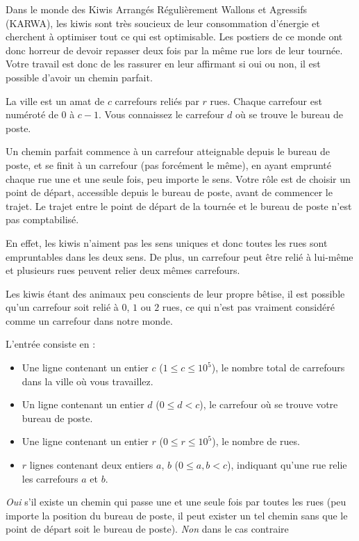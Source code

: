 

Dans le monde des Kiwis Arrangés Régulièrement Wallons et Agressifs (KARWA), les kiwis sont très soucieux de leur consommation d'énergie et cherchent à optimiser tout ce qui est optimisable. Les postiers de ce monde ont donc horreur de devoir repasser deux fois par la même rue lors de leur tournée. Votre travail est donc de les rassurer en leur affirmant si oui ou non, il est possible d'avoir un chemin parfait.

La ville est un amat de $c$ carrefours reliés par $r$ rues. Chaque carrefour est numéroté de $0$ à $c-1$. Vous connaissez le carrefour $d$ où se trouve le bureau de poste.

Un chemin parfait commence à un carrefour atteignable depuis le bureau de poste, et se finit à un carrefour (pas forcément le même), en ayant emprunté chaque rue une et une seule fois, peu importe le sens. Votre rôle est de choisir un point de départ, accessible depuis le bureau de poste, avant de commencer le trajet. Le trajet entre le point de départ de la tournée et le bureau de poste n'est pas comptabilisé.

En effet, les kiwis n'aiment pas les sens uniques et donc toutes les rues sont empruntables dans les deux sens. De plus, un carrefour peut être relié à lui-même et plusieurs rues peuvent relier deux mêmes carrefours.

Les kiwis étant des animaux peu conscients de leur propre bêtise, il est possible qu'un carrefour soit relié à $0$, $1$ ou $2$ rues, ce qui n'est pas vraiment considéré comme un carrefour dans notre monde.

\begin{Input}
    L'entrée consiste en :
    \begin{itemize}
        \item Une ligne contenant un entier $c$ ($1 \leq c \leq 10^5$), le nombre total de carrefours dans la ville où vous travaillez.
        \item Un ligne contenant un entier $d$ ($0 \leq d < c$), le carrefour où se trouve votre bureau de poste.
        \item Une ligne contenant un entier $r$ ($0 \leq r \leq 10^5$), le nombre de rues.
        \item $r$ lignes contenant deux entiers $a$, $b$ ($0 \leq a,b < c$), indiquant qu'une rue relie les carrefours $a$ et $b$.
    \end{itemize}
\end{Input}

\begin{Output}
    \emph{Oui} s'il existe un chemin qui passe une et une seule fois par toutes les rues (peu importe la position du bureau de poste, il peut exister un tel chemin sans que le point de départ soit le bureau de poste). \emph{Non} dans le cas contraire
\end{Output}
